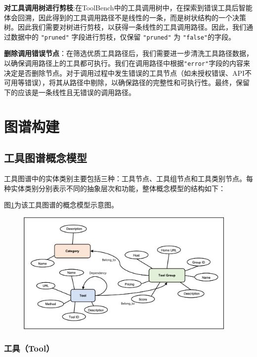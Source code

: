 \textbf{对工具调用树进行剪枝}:在ToolBench中的工具调用树中，在探索到错误工具后智能体会回溯，因此得到的工具调用路径不是线性的一条，而是树状结构的一个决策树。因此我们需要对树进行剪枝，以获得一条线性的工具调用路径。因此，我们通过数据中的 \texttt{"pruned"} 字段进行剪枝，仅保留 \texttt{"pruned"} 为 \texttt{"false"}的字段。

\textbf{删除调用错误节点}：在筛选优质工具路径后，我们需要进一步清洗工具路径数据，以确保调用路径上的工具都可执行。我们在调用路径中根据\texttt{"error"}字段的内容来决定是否删除节点。对于调用过程中发生错误的工具节点（如未授权错误、API不可用等错误），将其从路径中剔除，以确保路径的完整性和可执行性。最终，保留下的应该是一条线性且无错误的调用路径。


\section{图谱构建}

\subsection{工具图谱概念模型}

工具图谱中的实体类别主要包括三种：工具节点、工具组节点和工具类别节点。每种实体类别分别表示不同的抽象层次和功能，整体概念模型的结构如下：

图\ref{fig:ch3-knowledge-graph-ontology-model}为该工具图谱的概念模型示意图。

\begin{figure}[H]
    \vspace{1em}
    \centering
    \setlength{\abovecaptionskip}{10pt} %
    \includegraphics[height=6cm]{../assets/图谱概念模型.png}
    \label{fig:ch3-knowledge-graph-ontology-model}
\end{figure}

\subsubsection{工具（Tool）}

